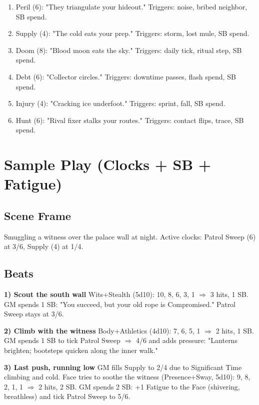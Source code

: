 \begin{enumerate}
\item Peril (6): "They triangulate your hideout." Triggers: noise, bribed neighbor, SB spend.
\item Supply (4): "The cold eats your prep." Triggers: storm, lost mule, SB spend.
\item Doom (8): "Blood moon eats the sky." Triggers: daily tick, ritual step, SB spend.
\item Debt (6): "Collector circles." Triggers: downtime passes, flash spend, SB spend.
\item Injury (4): "Cracking ice underfoot." Triggers: sprint, fall, SB spend.
\item Hunt (6): "Rival fixer stalks your routes." Triggers: contact flips, trace, SB spend.
\end{enumerate}

\section{Sample Play (Clocks + SB + Fatigue)}

\subsection{Scene Frame}
Smuggling a witness over the palace wall at night. Active clocks: Patrol Sweep (6) at 3/6, Supply (4) at 1/4.

\subsection{Beats}

\textbf{1) Scout the south wall} Wits+Stealth (5d10): 10, 8, 6, 3, 1 $\Rightarrow$ 3 hits, 1 SB. GM spends 1 SB: "You succeed, but your old rope is Compromised." Patrol Sweep stays at 3/6.

\textbf{2) Climb with the witness} Body+Athletics (4d10): 7, 6, 5, 1 $\Rightarrow$ 2 hits, 1 SB. GM spends 1 SB to tick Patrol Sweep $\Rightarrow$ 4/6 and adds pressure: "Lanterns brighten; bootsteps quicken along the inner walk."

\textbf{3) Last push, running low} GM fills Supply to 2/4 due to Significant Time climbing and cold. Face tries to soothe the witness (Presence+Sway, 5d10): 9, 8, 2, 1, 1 $\Rightarrow$ 2 hits, 2 SB. GM spends 2 SB: +1 Fatigue to the Face (shivering, breathless) and tick Patrol Sweep to 5/6.

